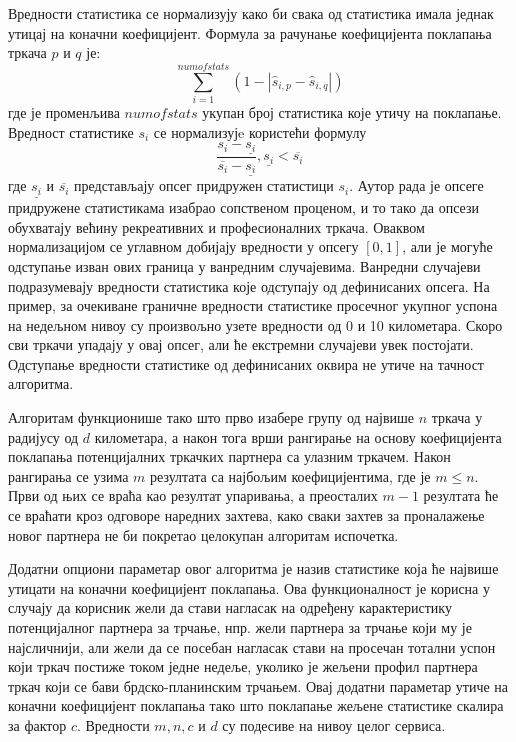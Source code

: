 \documentclass[12pt,oneside]{memoir}
\begin{document}
Вредности статистика се нормализују како би свака од статистика имала једнак утицај на коначни коефицијент. Формула за рачунање коефицијента поклапања тркача $p$ и $q$ је: \[ \sum_{i=1}^{numofstats} (1 - |\widehat{s}_{i,p} - \widehat{s}_{i,q}|) \] где је променљива $numofstats$ укупан број статистика које утичу на поклапање. Вредност статистике $s_i$ се нормализујe користећи формулу \[\frac{s_i - \underline{s_i}}{\overline{s_i} - \underline{s_i}}, \underline{s_i} < \overline{s_i}\] где $\underline{s_i}$ и $\overline{s_i}$ представљају опсег придружен статистици $s_i$. Аутор рада је опсеге придружене статистикама изабрао сопственом проценом, и то тако да опсези обухватају већину рекреативних и професионалних тркача. Оваквом нормализацијом се углавном добијају вредности у опсегу $[0, 1]$, али је могуће одступање изван ових граница у ванредним случајевима. Ванредни случајеви подразумевају вредности статистика које одступају од дефинисаних опсега. На пример, за очекиване граничне вредности статистике просечног укупног успона на недељном нивоу су произвољно узете вредности од 0 и 10 километара. Скоро сви тркачи упадају у овај опсег, али ће екстремни случајеви увек постојати. Одступање вредности статистике од дефинисаних оквира не утиче на тачност алгоритма.

Алгоритам функционише тако што прво изабере групу од највише $n$ тркача у радијусу од $d$ километара, а након тога врши рангирање на основу коефицијента поклапања потенцијалних тркачких партнера са улазним тркачем. Након рангирања се узима $m$ резултата са најбољим коефицијентима, где је $m \le n$. Први од њих се враћа као резултат упаривања, а преосталих $m-1$ резултата ће се враћати кроз одговоре наредних захтева, како сваки захтев за проналажење новог партнера не би покретао целокупан алгоритам испочетка.

Додатни опциони параметар овог алгоритма је назив статистике која ће највише утицати на коначни коефицијент поклапања. Ова функционалност је корисна у случају да корисник жели да стави нагласак на одређену карактеристику потенцијалног партнера за трчање, нпр. жели партнера за трчање који му је најсличнији, али жели да се посебан нагласак стави на просечан тотални успон који тркач постиже током једне недеље, уколико је жељени профил партнера тркач који се бави брдско-планинским трчањем. Овај додатни параметар утиче на коначни коефицијент поклапања тако што поклапање жељене статистике скалира за фактор $c$. Вредности $m, n, c$ и $d$ су подесиве на нивоу целог сервиса.
\end{document}
